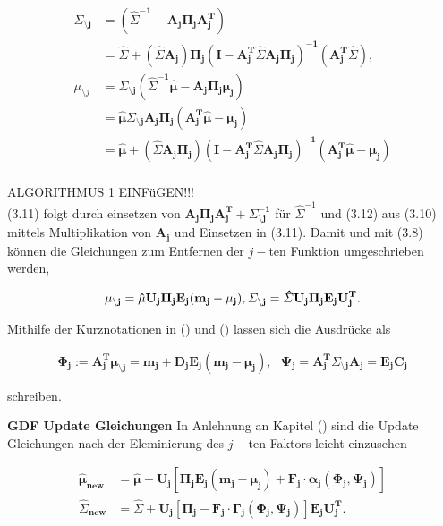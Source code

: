 \documentclass[12pt,a4paper]{scrartcl}
\numberwithin{equation}{section}
\begin{document}
\begin{equation}
 \begin{split}
  \mathbf{\varSigma_{\setminus j}} &= \mathbf{( \hat \varSigma^{-1} - A_j \Pi_j A_j^T)} \\
  &= \mathbf{\hat \varSigma + (\hat \varSigma A_j) \Pi_j (I - A_j^T \hat \varSigma A_j \Pi_j)^{-1} (A_j^T \hat \varSigma)}, \\
  \mu_{\setminus j} &= \mathbf{\varSigma_{\setminus j} (\hat \varSigma^{-1} \hat \mu - A_j \Pi_j \mu_j)} \\
  &= \mathbf{\hat \mu \varSigma_{\setminus j} A_j \Pi_j (A_j^T \hat \mu - \mu_j) }\\
  &= \mathbf{\hat \mu + ( \hat \varSigma A_j \Pi_j )( I - A_j^T \hat \varSigma A_j \Pi_j )^ {-1} (A_j^T \hat \mu - \mu_j)} \\
 \end{split}
\end{equation}


ALGORITHMUS 1 EINFüGEN!!! \\


(3.11) folgt durch einsetzen von $\mathbf{A_j \Pi_j A_j^T + \varSigma_{\setminus j}^{-1}}$ für $\hat \varSigma^{-1}$ und (3.12) aus (3.10) mittels Multiplikation
von $\mathbf{A_j}$ und Einsetzen in (3.11). Damit und mit (3.8) können die Gleichungen zum Entfernen der $j-$ten
Funktion umgeschrieben werden,

\begin{equation}
 \mathbf{\mu_{\setminus j} = \hat \mu U_j \Pi_j E_j(m_j - \mu_j), \varSigma_{\setminus j} = \hat \varSigma U_j \Pi_j E_j U_j^T.} \\ 
\end{equation}

Mithilfe der Kurznotationen in () und () lassen sich die Ausdrücke als 

\begin{equation}
 \mathbf{\Phi_j := A_j^T \mu_{\setminus j} = m_j + D_j E_j(m_j - \mu_j), \text{		} \Psi_j = A_j^T \varSigma_{\setminus j}A_j = E_j C_j}
\end{equation}

schreiben. 

\textbf{GDF Update Gleichungen	} In Anlehnung an Kapitel () sind die Update Gleichungen nach der Eleminierung des $j-$ten Faktors
leicht einzusehen 

\begin{equation}
 \begin{split}
  \mathbf{\hat \mu_{new}} &=  \mathbf{\hat \mu + U_j[\Pi_j E_j(m_j - \mu_j) + F_j \cdot \alpha_j(\Phi_j, \Psi_j)]} \\
  \mathbf{\hat \varSigma_{new}} &= \mathbf{ \hat \varSigma + U_j[\Pi_j - F_j \cdot \Gamma_j(\Phi_j, \Psi_j)] E_j U_j^T}. \\ 
 \end{split}
\end{equation}
\end{document}
